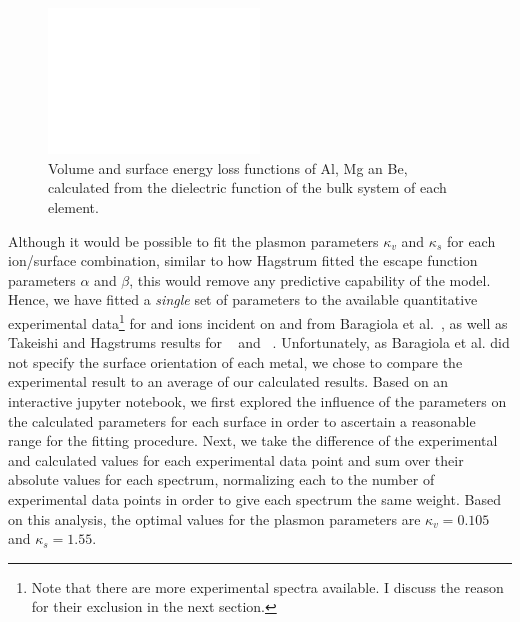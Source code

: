 \begin{refsection}
\begin{figure}[ht] 
\centering 
\captionsetup{width=0.9\textwidth}
\includegraphics[width=0.5\textwidth]{./figures/quotas/energy_loss.eps} 
\caption{Volume and surface energy loss functions of Al, Mg an Be, calculated 
from the dielectric function of the bulk system of each element.} 
\label{quotas:fig-energy_loss} 
\end{figure} 

Although it would be possible to fit the plasmon parameters $\kappa_v$  and 
$\kappa_s$ for each ion/surface combination, similar to how Hagstrum fitted 
the escape function parameters $\alpha$ and $\beta$, this would remove any 
predictive capability of the model. Hence, we have fitted a \textit{single} 
set of parameters to the available quantitative experimental 
data\footnote{Note that there are more experimental spectra available. I 
discuss the reason for their exclusion in the next section.} for  and 
 ions incident on  and  from Baragiola et al.~\cite{Baragiola2001}, as well as 
Takeishi and Hagstrums results for ~\cite{Takeishi1965} and 
~\cite{Hagstrum1966}. Unfortunately, as Baragiola et al. did not 
specify the surface orientation of each metal, we chose to compare the experimental result 
to an average of our calculated results. Based on an interactive jupyter 
notebook, we first explored the influence of the parameters on the calculated 
parameters for each surface in order to ascertain a reasonable range for the 
fitting procedure. Next, we take the difference of the experimental and 
calculated values for each experimental data point and sum over their absolute values for each spectrum, 
normalizing each to the number of experimental data points in order to give 
each spectrum the same weight. Based on this analysis, the optimal values for 
the plasmon parameters are $\kappa_v = 0.105$ and $\kappa_s = 1.55$. 

 

\end{refsection}
